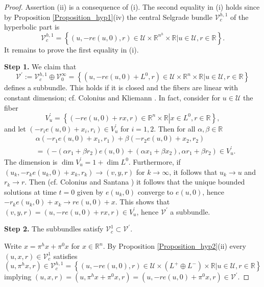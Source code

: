 \documentclass{siamltex}%
\begin{document}
\begin{proof}
Assertion (ii) is a consequence of (i). The second equality in (i) holds since
by Proposition \ref{Proposition_hyp1}(iv) the central Selgrade bundle
$\mathcal{V}_{c}^{h,1}$ of the hyperbolic part is%
\[
\mathcal{V}_{c}^{h,1}=\left\{  (u,-re(u,0),r)\in\mathcal{U}\times
\mathbb{R}^{n^{h}}\times\mathbb{R}\left\vert u\in\mathcal{U},r\in
\mathbb{R}\right.  \right\}  .
\]
It remains to prove the first equality in (i).

\textbf{Step 1.} We claim that%
\[
\mathcal{V}^{\prime}:=\mathcal{V}_{c}^{h,1}\oplus\mathcal{V}_{0}^{\infty
}=\left\{  (u,-re(u,0)+L^{0},r)\in\mathcal{U}\times\mathbb{R}^{n}%
\times\mathbb{R}\left\vert u\in\mathcal{U},r\in\mathbb{R}\right.  \right\}
\]
defines a subbundle. This holds if it is closed and the fibers are linear with
constant dimension; cf. Colonius and Kliemann \cite[Lemma B.1.13]{ColK00}. In
fact, consider for $u\in\mathcal{U}$ the fiber%
\[
V_{u}^{\prime}=\left\{  (-re(u,0)+rx,r)\in\mathbb{R}^{n}\times\mathbb{R}%
\left\vert x\in L^{0},r\in\mathbb{R}\right.  \right\}  ,
\]
and let $(-r_{i}e(u,0)+x_{i},r_{i})\in V_{u}^{\prime}$ for $i=1,2$. Then for
all $\alpha,\beta\in\mathbb{R}$%
\begin{align*}
&  \alpha(-r_{1}e(u,0)+x_{1},r_{1})+\beta(-r_{2}e(u,0)+x_{2},r_{2})\\
&  =(-(\alpha r_{1}+\beta r_{2})e(u,0)+(\alpha x_{1}+\beta x_{2}),\alpha
r_{1}+\beta r_{2})\in V_{u}^{\prime}.
\end{align*}
The dimension is $\dim V_{u}^{\prime}=1+\dim L^{0}$. Furthermore, if
$(u_{k},-r_{k}e(u_{k},0)+x_{k},r_{k})\rightarrow(v,y,r)$ for $k\rightarrow
\infty$, it follows that $u_{k}\rightarrow u$ and $r_{k}\rightarrow r$. Then
(cf. Colonius and Santana \cite[Theorem 2.5 and proof of Theorem
3.1]{ColSan11}) it follows that the unique bounded solutions at time $t=0$
given by $e(u_{k},0)$ converge to $e(u,0)$, hence $-r_{k}e(u_{k}%
,0)+x_{k}\rightarrow re(u,0)+x$. This shows that $(v,y,r)=(u,-re(u,0)+rx,r)\in
V_{u}^{\prime}$, hence $\mathcal{V}^{\prime}$ a subbundle.

\textbf{Step 2. }The subbundles satisfy $\mathcal{V}_{c}^{1}\subset
\mathcal{V}^{\prime}$.

Write $x=\pi^{h}x+\pi^{0}x$ for $x\in\mathbb{R}^{n}$. By Proposition
\ref{Proposition_hyp2}(ii) every $(u,x,r)\in\mathcal{V}_{c}^{1}$ satisfies%
\[
(u,\pi^{h}x,r)\in\mathcal{V}_{c}^{h,1}=\left\{  (u,-re(u,0),r)\in
\mathcal{U}\times(L^{+}\oplus L^{-})\times\mathbb{R}\left\vert u\in
\mathcal{U},r\in\mathbb{R}\right.  \right\}
\]
implying $(u,x,r)=(u,\pi^{h}x+\pi^{0}x,r)=(u,-re(u,0)+\pi^{0}x,r)\in
\mathcal{V}^{\prime}.$


\end{proof}
\end{document}
